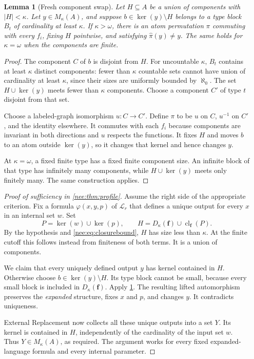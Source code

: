 \documentclass[11pt,letterpaper]{article}
\numberwithin{equation}{section}
\theoremstyle{plain}
\newtheorem{lemma}[lemma]{Lemma}
\theoremstyle{definition}
\theoremstyle{remark}
\newcommand{\kerat}{\operatorname{ker}}
\newcommand{\Langr}{\mathcal L_r}
\begin{document}
\begin{lemma}[Fresh component swap]\label{nee:lem:swap}
Let $H\subseteq A$ be a union of components with $|H|<\kappa$. Let $y\in M_\kappa(A)$, and suppose $b\in\kerat(y)\setminus H$ belongs to a type block $B_t$ of cardinality at least $\kappa$. If $\kappa>\omega$, there is an atom permutation $\pi$ commuting with every $f_i$, fixing $H$ pointwise, and satisfying $\widehat\pi(y)\neq y$. The same holds for $\kappa=\omega$ when the components are finite.
\end{lemma}
\begin{proof}
The component $C$ of $b$ is disjoint from $H$. For uncountable $\kappa$, $B_t$ contains at least $\kappa$ distinct components: fewer than $\kappa$ countable sets cannot have union of cardinality at least $\kappa$, since their sizes are uniformly bounded by $\aleph_0$. The set $H\cup\kerat(y)$ meets fewer than $\kappa$ components. Choose a component $C'$ of type $t$ disjoint from that set.

Choose a labeled-graph isomorphism $u:C\to C'$. Define $\pi$ to be $u$ on $C$, $u^{-1}$ on $C'$, and the identity elsewhere. It commutes with each $f_i$ because components are invariant in both directions and $u$ respects the functions. It fixes $H$ and moves $b$ to an atom outside $\kerat(y)$, so it changes that kernel and hence changes $y$.

At $\kappa=\omega$, a fixed finite type has a fixed finite component size. An infinite block of that type has infinitely many components, while $H\cup\kerat(y)$ meets only finitely many. The same construction applies.
\end{proof}

\begin{proof}[Proof of sufficiency in \cref{nee:thm:profile}]
Assume the right side of the appropriate criterion. Fix a formula $\varphi(x,y,p)$ of $\Langr$ that defines a unique output for every $x$ in an internal set $w$. Set
\begin{equation}\label{nee:eq:H}
P=\kerat(w)\cup\kerat(p),\qquad
H=D_\kappa(\boldsymbol f)\cup\operatorname{cl}_{\boldsymbol f}(P).
\end{equation}
By the hypothesis and \eqref{nee:eq:closurebound}, $H$ has size less than $\kappa$. At the finite cutoff this follows instead from finiteness of both terms. It is a union of components.

We claim that every uniquely defined output $y$ has kernel contained in $H$. Otherwise choose $b\in\kerat(y)\setminus H$. Its type block cannot be small, because every small block is included in $D_\kappa(\boldsymbol f)$. Apply \cref{nee:lem:swap}. The resulting lifted automorphism preserves the \emph{expanded} structure, fixes $x$ and $p$, and changes $y$. It contradicts uniqueness.

External Replacement now collects all these unique outputs into a set $Y$. Its kernel is contained in $H$, independently of the cardinality of the input set $w$. Thus $Y\in M_\kappa(A)$, as required. The argument works for every fixed expanded-language formula and every internal parameter.
\end{proof}
\end{document}
